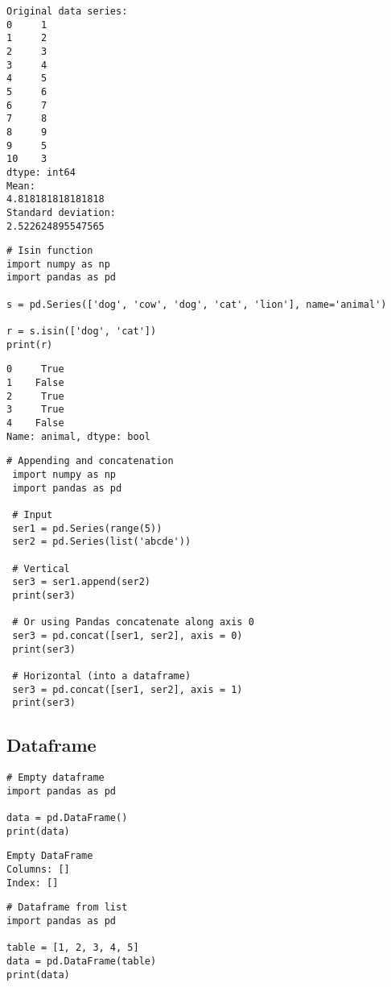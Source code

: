 \documentclass[11pt]{article}
\begin{document}
\begin{verbatim}
Original data series:
0     1
1     2
2     3
3     4
4     5
5     6
6     7
7     8
8     9
9     5
10    3
dtype: int64
Mean:
4.818181818181818
Standard deviation:
2.522624895547565
\end{verbatim}

\begin{verbatim}
# Isin function
import numpy as np
import pandas as pd

s = pd.Series(['dog', 'cow', 'dog', 'cat', 'lion'], name='animal')

r = s.isin(['dog', 'cat'])
print(r)
\end{verbatim}

\begin{verbatim}
0     True
1    False
2     True
3     True
4    False
Name: animal, dtype: bool
\end{verbatim}


\begin{verbatim}
# Appending and concatenation
 import numpy as np
 import pandas as pd

 # Input
 ser1 = pd.Series(range(5))
 ser2 = pd.Series(list('abcde'))

 # Vertical
 ser3 = ser1.append(ser2)
 print(ser3)

 # Or using Pandas concatenate along axis 0
 ser3 = pd.concat([ser1, ser2], axis = 0)
 print(ser3)

 # Horizontal (into a dataframe)
 ser3 = pd.concat([ser1, ser2], axis = 1)
 print(ser3)
\end{verbatim}

\subsection{Dataframe}
\label{sec:org2e246a6}

\begin{verbatim}
# Empty dataframe
import pandas as pd

data = pd.DataFrame()
print(data)
\end{verbatim}

\begin{verbatim}
Empty DataFrame
Columns: []
Index: []
\end{verbatim}



\begin{verbatim}
# Dataframe from list
import pandas as pd

table = [1, 2, 3, 4, 5]
data = pd.DataFrame(table)
print(data)
\end{verbatim}
\end{document}
